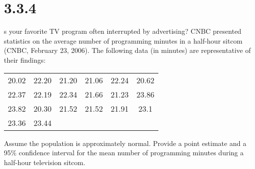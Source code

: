 \documentclass{article}
\begin{document}
\section*{3.3.4}
s your favorite TV program often interrupted by advertising? CNBC presented statistics on the average number of programming minutes in a half-hour sitcom (CNBC, February 23, 2006). The following data (in minutes) are representative of their findings:
\begin{table}[h!]
  \centering
  \begin{tabular}{c c c c c c}
    20.02&22.20&21.20&21.06&22.24&20.62\\
    22.37&22.19&22.34&21.66&21.23&23.86\\
    23.82&20.30&21.52&21.52&21.91&23.1\\
    23.36&23.44&&&&\\
  \end{tabular}
\end{table}
Assume the population is approximately normal. Provide a point estimate and a 95\% confidence interval for the mean number of programming minutes during a half-hour television sitcom.
\end{document}
